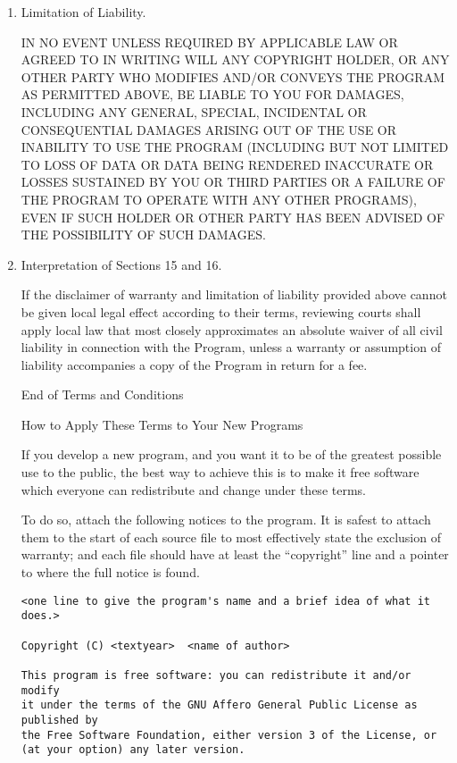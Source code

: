 \documentclass{article}%
\begin{document}
\begin{enumerate}
\item Limitation of Liability.

 IN NO EVENT UNLESS REQUIRED BY APPLICABLE LAW OR AGREED TO IN
 WRITING WILL ANY COPYRIGHT HOLDER, OR ANY OTHER PARTY WHO MODIFIES
 AND/OR CONVEYS THE PROGRAM AS PERMITTED ABOVE, BE LIABLE TO YOU FOR
 DAMAGES, INCLUDING ANY GENERAL, SPECIAL, INCIDENTAL OR CONSEQUENTIAL
 DAMAGES ARISING OUT OF THE USE OR INABILITY TO USE THE PROGRAM
 (INCLUDING BUT NOT LIMITED TO LOSS OF DATA OR DATA BEING RENDERED
 INACCURATE OR LOSSES SUSTAINED BY YOU OR THIRD PARTIES OR A FAILURE
 OF THE PROGRAM TO OPERATE WITH ANY OTHER PROGRAMS), EVEN IF SUCH
 HOLDER OR OTHER PARTY HAS BEEN ADVISED OF THE POSSIBILITY OF SUCH
 DAMAGES.

\item Interpretation of Sections 15 and 16.

If the disclaimer of warranty and limitation of liability provided
above cannot be given local legal effect according to their terms,
reviewing courts shall apply local law that most closely approximates
an absolute waiver of all civil liability in connection with the
Program, unless a warranty or assumption of liability accompanies a
copy of the Program in return for a fee.

\begin{center}
{\Large\sc End of Terms and Conditions}

\bigskip
How to Apply These Terms to Your New Programs
\end{center}

If you develop a new program, and you want it to be of the greatest
possible use to the public, the best way to achieve this is to make it
free software which everyone can redistribute and change under these terms.

To do so, attach the following notices to the program.  It is safest
to attach them to the start of each source file to most effectively
state the exclusion of warranty; and each file should have at least
the ``copyright'' line and a pointer to where the full notice is found.

{\footnotesize
\begin{verbatim}
<one line to give the program's name and a brief idea of what it does.>

Copyright (C) <textyear>  <name of author>

This program is free software: you can redistribute it and/or modify
it under the terms of the GNU Affero General Public License as published by
the Free Software Foundation, either version 3 of the License, or
(at your option) any later version.


\end{verbatim}}
\end{enumerate}
\end{document}
